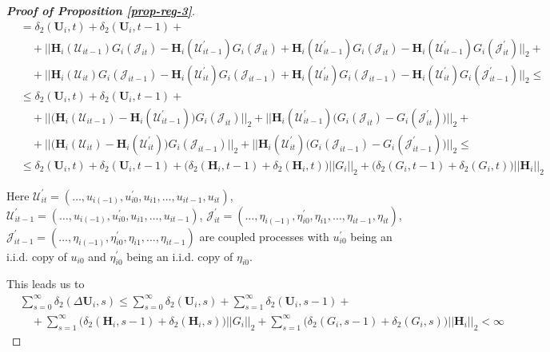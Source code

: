\begin{proof}[\textnormal{\textbf{Proof of Proposition \ref{prop-reg-3}}}]
\begin{align*}
 & = \delta_2(\mathbf{U}_i, t) + \delta_2(\mathbf{U}_i, t-1)  +\\
 &\quad + ||\mathbf{H}_i(\mathcal{U}_{it-1})G_i(\mathcal{J}_{it}) - \mathbf{H}_i(\mathcal{U}_{it-1}^\prime)G_i(\mathcal{J}_{it}) + \mathbf{H}_i(\mathcal{U}_{it-1}^\prime)G_i(\mathcal{J}_{it}) - \mathbf{H}_i(\mathcal{U}_{it-1}^\prime)G_i(\mathcal{J}_{it}^\prime)    ||_2+\\
 &\quad + ||\mathbf{H}_i(\mathcal{U}_{it})G_i(\mathcal{J}_{it-1}) -\mathbf{H}_i(\mathcal{U}_{it}^\prime)G_i(\mathcal{J}_{it-1})+ \mathbf{H}_i(\mathcal{U}_{it}^\prime)G_i(\mathcal{J}_{it-1})-  \mathbf{H}_i(\mathcal{U}_{it}^\prime)G_i(\mathcal{J}_{it-1}^\prime) ||_2 \leq\\
  &\leq \delta_2(\mathbf{U}_i, t) + \delta_2(\mathbf{U}_i, t-1)  + \\
  &\quad +||\big(\mathbf{H}_i(\mathcal{U}_{it-1}) - \mathbf{H}_i(\mathcal{U}_{it-1}^\prime)\big) G_i(\mathcal{J}_{it})||_2 +  ||\mathbf{H}_i(\mathcal{U}_{it-1}^\prime)\big(G_i(\mathcal{J}_{it}) - G_i(\mathcal{J}_{it}^\prime)\big)    ||_2+\\
 &\quad + ||\big(\mathbf{H}_i(\mathcal{U}_{it}) -\mathbf{H}_i(\mathcal{U}_{it}^\prime)\big)G_i(\mathcal{J}_{it-1})||_2 + ||\mathbf{H}_i(\mathcal{U}_{it}^\prime)\big(G_i(\mathcal{J}_{it-1}) -G_i(\mathcal{J}_{it-1}^\prime)\big) ||_2 \leq \\
 &\leq \delta_2(\mathbf{U}_i, t) + \delta_2(\mathbf{U}_i, t-1)  + \big(\delta_2(\mathbf{H}_i, t-1) +  \delta_2(\mathbf{H}_i, t)\big) ||G_i ||_2+ \big( \delta_2(G_i, t-1) +  \delta_2(G_i, t)\big)||\mathbf{H}_i ||_2  
\end{align*}

Here $\mathcal{U}_{it}^\prime  = (\ldots, u_{i(-1)}, u^\prime_{i0}, u_{i1}, \ldots, u_{it-1}, u_{it})$, $\mathcal{U}_{it-1}^\prime  = (\ldots, u_{i(-1)}, u^\prime_{i0}, u_{i1}, \ldots, u_{it-1})$, $\mathcal{J}_{it}^\prime  = (\ldots, \eta_{i(-1)}, \eta^\prime_{i0}, \eta_{i1}, \ldots, \eta_{it-1}, \eta_{it})$, $\mathcal{J}_{it-1}^\prime  = (\ldots, \eta_{i(-1)}, \eta^\prime_{i0}, \eta_{i1}, \ldots, \eta_{it-1})$ are coupled processes with $u_{i0}^\prime$ being an i.i.d. copy of $u_{i0}$ and $\eta_{i0}^\prime$ being an i.i.d. copy of $\eta_{i0}$.

This leads us to 
\begin{align*}
 &\sum_{s=0}^\infty \delta_2(\Delta \mathbf{U}_i, s) \leq \sum_{s=0}^\infty \delta_2(\mathbf{U}_i, s) + \sum_{s=1}^\infty\delta_2(\mathbf{U}_i, s-1)  +\\
 &\quad + \sum_{s=1}^\infty\big(\delta_2(\mathbf{H}_i, s-1) +  \delta_2(\mathbf{H}_i, s)\big) ||G_i ||_2 + \sum_{s=1}^\infty\big( \delta_2(G_i, s-1) +  \delta_2(G_i, s)\big)||\mathbf{H}_i ||_2 <\infty 
\end{align*}


\end{proof}


